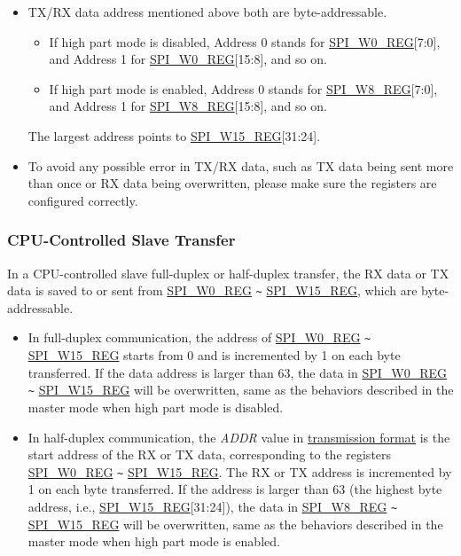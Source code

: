 \documentclass[main\_\_EN.tex]{subfiles}
\begin{document}
\begin{tiplisting}
\vspace{-2em}
\begin{itemize}
    \item TX/RX data address mentioned above both are byte-addressable. 
    \begin{itemize}
        \item If high part mode is disabled, Address 0 stands for \hyperref[regdesc:SPIW0REG]{SPI\_W0\_REG}[7:0], and Address 1 for \hyperref[regdesc:SPIW0REG]{SPI\_W0\_REG}[15:8], and so on. 
        \item If high part mode is enabled, Address 0 stands for \hyperref[regdesc:SPIW0REG]{SPI\_W8\_REG}[7:0], and Address 1 for \hyperref[regdesc:SPIW0REG]{SPI\_W8\_REG}[15:8], and so on. 
    \end{itemize}
    The largest address points to \hyperref[regdesc:SPIW0REG]{SPI\_W15\_REG}[31:24].
    \item To avoid any possible error in TX/RX data, such as TX data being sent more than once or RX data being overwritten, please make sure the registers are configured correctly.
\end{itemize}
\end{tiplisting}

\subsubsection{CPU-Controlled Slave Transfer} \label{GP-SPI2 slave CPU}

In a CPU-controlled slave full-duplex or half-duplex transfer, the RX data or TX data is saved to or sent from \hyperref[regdesc:SPIW0REG]{SPI\_W0\_REG} \verb+~+ \hyperref[regdesc:SPIW0REG]{SPI\_W15\_REG}, which are byte-addressable.

\begin{itemize}
    \item In full-duplex communication, the address of \hyperref[regdesc:SPIW0REG]{SPI\_W0\_REG} \verb+~+ \hyperref[regdesc:SPIW0REG]{SPI\_W15\_REG} starts from 0 and is incremented by 1 on each byte transferred. If the data address is larger than 63, the data in \hyperref[regdesc:SPIW0REG]{SPI\_W0\_REG} \verb+~+ \hyperref[regdesc:SPIW0REG]{SPI\_W15\_REG} will be overwritten, same as the behaviors described in the master mode when high part mode is disabled. 
    \item In half-duplex communication, the \emph{ADDR} value in \hyperref[slave communication format]{transmission format} is the start address of the RX or TX data, corresponding to the registers \hyperref[regdesc:SPIW0REG]{SPI\_W0\_REG} \verb+~+ \hyperref[regdesc:SPIW0REG]{SPI\_W15\_REG}. The RX or TX address is incremented by 1 on each byte transferred. If the address is larger than 63 (the highest byte address, i.e., \hyperref[regdesc:SPIW0REG]{SPI\_W15\_REG}[31:24]), the data in \hyperref[regdesc:SPIW0REG]{SPI\_W8\_REG} \verb+~+ \hyperref[regdesc:SPIW0REG]{SPI\_W15\_REG} will be overwritten, same as the behaviors described in the master mode when high part mode is enabled. 
\end{itemize}
\end{document}
